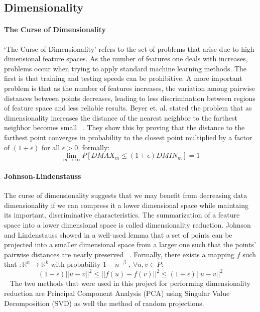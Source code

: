 \subsection{Dimensionality}
\paragraph{The Curse of Dimensionality} %
\label{par:paragraph_name}
`The Curse of Dimensionality' refers to the set of problems that arise due to high dimensional feature spaces. As the number of features one deals with increases, problems occur when trying to apply standard machine learning methods. The first is that training and testing speeds can be prohibitive.  A more important problem is that as the number of features increases, the variation among pairwise distances between points decreases, leading to less discrimination between regions of feature space and less reliable results. Beyer et. al. stated the problem that as dimensionality increases the distance of the nearest neighbor to the farthest neighbor becomes small ~\cite{beyer1999nearest}. They show this by proving that the distance to the farthest point converges in probability to the closest point multiplied by a factor of $(1+\epsilon)$ for all $\epsilon > 0$, formally:
\begin{equation}
	\lim_{m\rightarrow \infty} P[DMAX_m \le (1+\epsilon)DMIN_m]=1
\end{equation}
\paragraph{Johnson-Lindenstauss} %
\label{par:johnson_lindenstauss}
The curse of dimensionality suggests that we may benefit from decreasing data dimensionality if we can compress it a lower dimensional space while maintaing its important, discriminative characteristics. The summarization of a feature space into a lower dimensional space is called dimensionality reduction. Johnson and Lindenstauss  showed in a well-used lemma that a set of points can be projected into a smaller dimensional space from a larger one such that the points' pairwise distances are nearly preserved ~\cite{johnson1984extensions}. Formally, there exists a mapping $f$ such that $:\mathbb{R}^n \rightarrow \mathbb{R}^k$ with probability $1-n^{-\beta}$ ,  $\forall u,v \in P$:
\begin{equation}
	(1 - \epsilon)||u - v||^2 \le ||f(u)-f(v)||^2 \le (1+\epsilon)||u-v||^2
\end{equation}  ~\cite{achlioptas2001database} The two methods that were used in this project for performing dimensionality reduction are Principal Component Analysis (PCA) using Singular Value Decomposition (SVD) as well the method of random projections.
